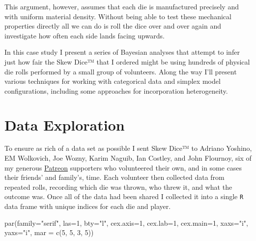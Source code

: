 \documentclass[
  letterpaper,
  DIV=11,
  numbers=noendperiod]{scrartcl}
\newenvironment{Shaded}{\begin{snugshade}}{\end{snugshade}}
\newcommand{\AttributeTok}[1]{\textcolor[rgb]{0.40,0.45,0.13}{#1}}
\newcommand{\DecValTok}[1]{\textcolor[rgb]{0.68,0.00,0.00}{#1}}
\newcommand{\FunctionTok}[1]{\textcolor[rgb]{0.28,0.35,0.67}{#1}}
\newcommand{\NormalTok}[1]{\textcolor[rgb]{0.00,0.23,0.31}{#1}}
\newcommand{\StringTok}[1]{\textcolor[rgb]{0.13,0.47,0.30}{#1}}
\begin{document}
This argument, however, assumes that each die is manufactured precisely
and with uniform material density. Without being able to test these
mechanical properties directly all we can do is roll the dice over and
over again and investigate how often each side lands facing upwards.

In this case study I present a series of Bayesian analyses that attempt
to infer just how fair the Skew Dice™ that I ordered might be using
hundreds of physical die rolls performed by a small group of volunteers.
Along the way I'll present various techniques for working with
categorical data and simplex model configurations, including some
approaches for incorporation heterogeneity.

\section{Data Exploration}\label{data-exploration}

To ensure as rich of a data set as possible I sent Skew Dice™ to Adriano
Yoshino, EM Wolkovich, Joe Wozny, Karim Naguib, Ian Costley, and John
Flournoy, six of my generous
\href{https://www.patreon.com/betanalpha}{Patreon} supporters who
volunteered their own, and in some cases their friends' and family's,
time. Each volunteer then collected data from repeated rolls, recording
which die was thrown, who threw it, and what the outcome was. Once all
of the data had been shared I collected it into a single \texttt{R} data
frame with unique indices for each die and player.

\begin{Shaded}
\begin{Highlighting}[]
\FunctionTok{par}\NormalTok{(}\AttributeTok{family=}\StringTok{"serif"}\NormalTok{, }\AttributeTok{las=}\DecValTok{1}\NormalTok{, }\AttributeTok{bty=}\StringTok{"l"}\NormalTok{,}
    \AttributeTok{cex.axis=}\DecValTok{1}\NormalTok{, }\AttributeTok{cex.lab=}\DecValTok{1}\NormalTok{, }\AttributeTok{cex.main=}\DecValTok{1}\NormalTok{,}
    \AttributeTok{xaxs=}\StringTok{"i"}\NormalTok{, }\AttributeTok{yaxs=}\StringTok{"i"}\NormalTok{, }\AttributeTok{mar =} \FunctionTok{c}\NormalTok{(}\DecValTok{5}\NormalTok{, }\DecValTok{5}\NormalTok{, }\DecValTok{3}\NormalTok{, }\DecValTok{5}\NormalTok{))}
\end{Highlighting}
\end{Shaded}
\end{document}
